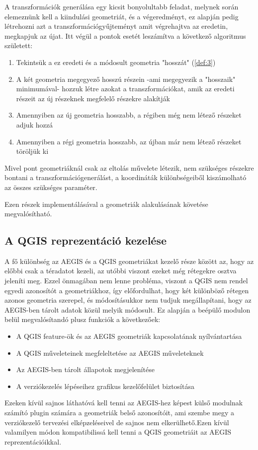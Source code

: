A transzformációk generálása egy kicsit bonyolultabb feladat, melynek során elemeznünk kell a kiindulási geometriát, és a végeredményt, ez alapján pedig létrehozni azt a transzformációgyűjteményt amit végrehajtva az eredetin, megkapjuk az újat. Itt végül a pontok esetét leszámítva a következő algoritmus született:
\begin{enumerate}
	\item Tekintsük a ez eredeti és a módosult geometria "hosszát" (\ref{def:3})
	\item A két geometria megegyező hosszú részein -ami megegyezik a "hosszaik" minimumával- hozzuk létre azokat a transzformációkat, amik az eredeti részeit az új részeknek megfelelő részekre alakítják
	\item Amennyiben az új geometria hosszabb, a régiben még nem létező részeket adjuk hozzá
	\item Amennyiben a régi geometria hosszabb, az újban már nem létező részeket töröljük ki
\end{enumerate}

Mivel pont geometriáknál csak az eltolás művelete létezik, nem szükséges részekre bontani a transzformációgenerálást, a koordináták különbségeiből kiszámolható az összes szükséges paraméter.

Ezen részek implementálásával a geometriák alakulásának követése megvalósítható.

\subsection{A QGIS reprezentáció kezelése}
A fő különbség az AEGIS és a QGIS geometriákat kezelő része között az, hogy az előbbi csak a téradatot kezeli, az utóbbi viszont ezeket még rétegekre osztva jeleníti meg. Ezzel önmagában nem lenne probléma, viszont a QGIS nem rendel egyedi azonosítót a geometriákhoz, így előfordulhat, hogy két különböző rétegen azonos geometria szerepel, és módosításukkor nem tudjuk megállapítani, hogy az AEGIS-ben tárolt adatok közül melyik módosult. Ez alapján  a beépülő modulon belül megvalósítandó plusz funkciók a következőek:
\begin{itemize}
	\item A QGIS feature-ök és az AEGIS geometriák kapcsolatának nyílvántartása
	\item A QGIS műveleteinek megfeleltetése az AEGIS műveleteknek
	\item Az AEGIS-ben tárolt állapotok megjelenítése 
	\item A verziókezelés lépéseihez grafikus kezelőfelület biztosítása
\end{itemize}
Ezeken kívül sajnos láthatóvá kell tenni az AEGIS-hez képest külső modulnak számító plugin számára a geometriák belső azonosítóit, ami szembe megy a verziókezelő tervezési elképzeléseivel de sajnos nem elkerülhető.Ezen kívül valamilyen módon kompatibilissá kell tenni a QGIS geometriáit az AEGIS reprezentációikkal.

